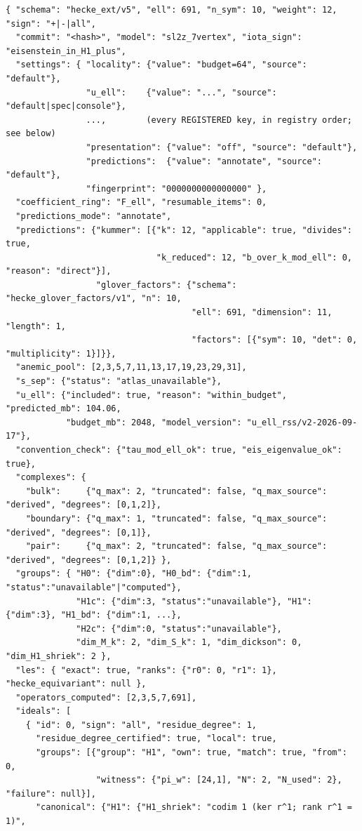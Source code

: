 \documentclass[11pt]{article}
\theoremstyle{remark}
\begin{document}
{\footnotesize
\begin{verbatim}
{ "schema": "hecke_ext/v5", "ell": 691, "n_sym": 10, "weight": 12, "sign": "+|-|all",
  "commit": "<hash>", "model": "sl2z_7vertex", "iota_sign": "eisenstein_in_H1_plus",
  "settings": { "locality": {"value": "budget=64", "source": "default"},
                "u_ell":    {"value": "...", "source": "default|spec|console"},
                ...,        (every REGISTERED key, in registry order; see below)
                "presentation": {"value": "off", "source": "default"},
                "predictions":  {"value": "annotate", "source": "default"},
                "fingerprint": "0000000000000000" },
  "coefficient_ring": "F_ell", "resumable_items": 0,
  "predictions_mode": "annotate",
  "predictions": {"kummer": [{"k": 12, "applicable": true, "divides": true,
                              "k_reduced": 12, "b_over_k_mod_ell": 0, "reason": "direct"}],
                  "glover_factors": {"schema": "hecke_glover_factors/v1", "n": 10,
                                     "ell": 691, "dimension": 11, "length": 1,
                                     "factors": [{"sym": 10, "det": 0, "multiplicity": 1}]}},
  "anemic_pool": [2,3,5,7,11,13,17,19,23,29,31],
  "s_sep": {"status": "atlas_unavailable"},
  "u_ell": {"included": true, "reason": "within_budget", "predicted_mb": 104.06,
            "budget_mb": 2048, "model_version": "u_ell_rss/v2-2026-09-17"},
  "convention_check": {"tau_mod_ell_ok": true, "eis_eigenvalue_ok": true},
  "complexes": {
    "bulk":     {"q_max": 2, "truncated": false, "q_max_source": "derived", "degrees": [0,1,2]},
    "boundary": {"q_max": 1, "truncated": false, "q_max_source": "derived", "degrees": [0,1]},
    "pair":     {"q_max": 2, "truncated": false, "q_max_source": "derived", "degrees": [0,1,2]} },
  "groups": { "H0": {"dim":0}, "H0_bd": {"dim":1, "status":"unavailable"|"computed"},
              "H1c": {"dim":3, "status":"unavailable"}, "H1": {"dim":3}, "H1_bd": {"dim":1, ...},
              "H2c": {"dim":0, "status":"unavailable"},
              "dim_M_k": 2, "dim_S_k": 1, "dim_dickson": 0, "dim_H1_shriek": 2 },
  "les": { "exact": true, "ranks": {"r0": 0, "r1": 1}, "hecke_equivariant": null },
  "operators_computed": [2,3,5,7,691],
  "ideals": [
    { "id": 0, "sign": "all", "residue_degree": 1,
      "residue_degree_certified": true, "local": true,
      "groups": [{"group": "H1", "own": true, "match": true, "from": 0,
                  "witness": {"pi_w": [24,1], "N": 2, "N_used": 2}, "failure": null}],
      "canonical": {"H1": {"H1_shriek": "codim 1 (ker r^1; rank r^1 = 1)",

\end{verbatim}}
\end{document}
